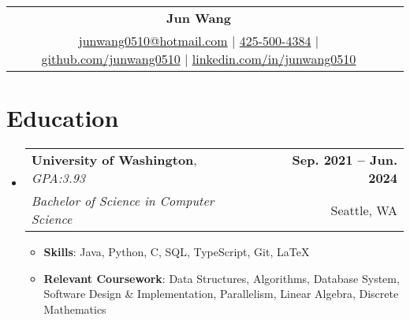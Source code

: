 \documentclass[letterpaper,11pt]{article}
\begin{document}
\begin{tabularx}{\textwidth}{X c X c}
  & \textbf{\LARGE{Jun Wang}} & \\
  & \href{mailto:junwang0510@hotmail.com}{junwang0510@hotmail.com} $\vert$ \href{tel:4255004384}{425-500-4384} $\vert$ \href{https://github.com/junwang0510}{{github.com/junwang0510}} $\vert$ \href{https://www.linkedin.com/in/junwang0510}{{linkedin.com/in/junwang0510}}
\end{tabularx}


\section{Education}
\begin{itemize}[nosep,label={},leftmargin=0in]
  \item
  \begin{tabularx}{\textwidth}{Xr@{}}
    \textbf{University of Washington}, \textit{GPA:\@ 3.93} & \textbf{Sep. 2021 -- Jun. 2024} \\
    \textit{Bachelor of Science in Computer Science} & Seattle, WA
  \end{tabularx}
  \begin{itemize}[nosep]
    \item \small{\textbf{Skills}: Java, Python, C, SQL, TypeScript, Git, \LaTeX}
    \item \small{\textbf{Relevant Coursework}: Data Structures, Algorithms, 
    Database System, Software Design \& Implementation, Parallelism, Linear Algebra, Discrete Mathematics}
  \end{itemize}
\end{itemize}


\end{document}
